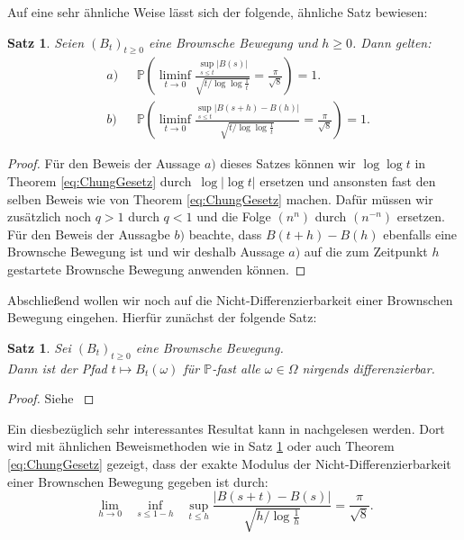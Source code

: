 \documentclass[12pt,a4paper]{scrartcl}
\numberwithin{equation}{section}
\numberwithin{equation}{section}%
\newtheorem{satz}[thm]{Satz}%
\theoremstyle{definition}
\begin{document}
\noindent Auf eine sehr ähnliche Weise lässt sich der folgende, ähnliche Satz bewiesen:

\begin{satz}\label{eq:NichtDiffbar}
Seien $(B_t)_{t\geq 0}$ eine Brownsche Bewegung und $h\geq 0$. Dann gelten:
\begin{align*}
\text{ $a)$ }&\mathbb{P} \left( \liminf\limits_{t\to 0} \frac{\sup_{s\leq t}\vert B(s)\vert}{\sqrt{t/\log\log \frac{1}{t}}} = \frac{\pi}{\sqrt{8}} \right) = 1.\\
\text{ $b)$ }&\mathbb{P} \left( \liminf\limits_{t\to 0} \frac{\sup_{s\leq t}\vert B(s+h)- B(h)\vert}{\sqrt{t/\log\log \frac{1}{t}}} = \frac{\pi}{\sqrt{8}} \right) = 1.
\end{align*}
\end{satz}

\begin{proof} Für den Beweis der Aussage $a)$ dieses Satzes können wir $\log\log t$ in Theorem \ref{eq:ChungGesetz} durch~$\log \vert \log t \vert $ ersetzen und ansonsten fast den selben Beweis wie von Theorem \ref{eq:ChungGesetz} machen. Dafür müssen wir zusätzlich noch $q>1$ durch $q<1$ und die Folge $(n^n)$ durch $(n^{-n})$ ersetzen.\\
Für den Beweis der Aussagbe $b)$ beachte, dass $B(t+h)-B(h)$ ebenfalls eine Brownsche Bewegung ist und wir deshalb Aussage $a)$ auf die zum Zeitpunkt $h$ gestartete Brownsche Bewegung anwenden können.
\end{proof}

\noindent Abschließend wollen wir noch auf die Nicht-Differenzierbarkeit einer Brownschen Bewegung eingehen. Hierfür zunächst der folgende Satz:

\begin{satz} Sei $(B_t)_{t\geq 0}$ eine Brownsche Bewegung.\\
Dann ist der Pfad $t \mapsto B_t(\omega)$ für $\mathbb{P}$-fast alle $\omega \in \Omega$ nirgends differenzierbar.
\end{satz}

\begin{proof}
Siehe \cite[Theorem 10.3, Seite 155 ff]{Schilling}
\end{proof}

\noindent Ein diesbezüglich sehr interessantes Resultat kann in \cite[32, Seite 44-47]{Csorgo Revesz} nachgelesen werden. Dort wird mit ähnlichen Beweismethoden wie in Satz \ref{eq:NichtDiffbar} oder auch Theorem \ref{eq:ChungGesetz} gezeigt, dass der exakte Modulus der Nicht-Differenzierbarkeit einer Brownschen Bewegung gegeben ist durch:
\begin{equation*}
\lim_{h\to 0}\text{ } \inf_{s\leq 1-h}\text{ } \sup_{t\leq h} \frac{\vert B(s+t)-B(s)\vert}{\sqrt{h/\log \frac{1}{h}}} = \frac{\pi}{\sqrt{8}}.
\end{equation*}
\end{document}
